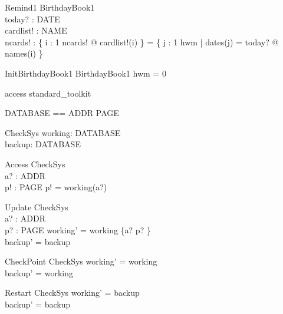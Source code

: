 \documentclass{llncs}
\begin{document}
\begin{schema}{Remind1}
\Xi BirthdayBook1 \\
today? : DATE \\
cardlist! : \nat \fun NAME \\
ncards! : \nat
\where
\{ i : 1 \upto ncards! @ cardlist!(i) \} = \{ j : 1 \upto hwm | dates(j) = today? @ names(i) \}
\end{schema}
\begin{schema}{InitBirthdayBook1}
BirthdayBook1
\where
hwm = 0
\end{schema}



\begin{zsection}
\SECTION access \parents standard\_toolkit
\end{zsection}

\begin{zed}
\end{zed}

\begin{zed}
DATABASE == ADDR \fun PAGE
\end{zed}

\begin{schema}{CheckSys}
working: DATABASE \\
backup: DATABASE
\end{schema}

\begin{schema}{Access}
\Xi CheckSys \\
a? : ADDR \\
p! : PAGE
\where
p! = working(a?)
\end{schema}

\begin{schema}{Update}
\Delta CheckSys \\
a? : ADDR \\
p? : PAGE
\where
working' = working \oplus \{a? \mapsto p? \} \\
backup' = backup
\end{schema}

\begin{schema}{CheckPoint}
\Delta CheckSys
\where
working' = working \\
backup' = working
\end{schema}

\begin{schema}{Restart}
\Delta CheckSys
\where
working' = backup \\
backup' = backup
\end{schema}
\end{document}
